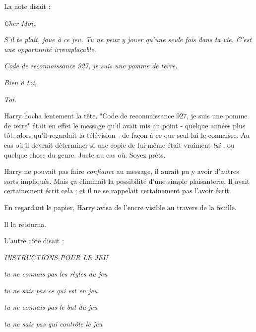 La note disait :

\emph{Cher Moi,} 

\emph{S'il te plaît, joue à ce jeu. Tu ne peux y jouer qu'une seule fois dans ta vie. C'est une opportunité irremplaçable.} 

\emph{Code de reconnaissance 927, je suis une pomme de terre.} 

\emph{Bien à toi,} 

\emph{Toi.} 

Harry hocha lentement la tête. "Code de reconnaissance 927, je suis une pomme de terre" était en effet le message qu'il avait mis au point - quelque années plus tôt, alors qu'il regardait la télévision - de façon à ce que seul lui le connaisse. Au cas où il devrait déterminer si une copie de lui-même était vraiment \emph{lui} , ou quelque chose du genre. Juste au cas où. Soyez prêts.

Harry ne pouvait pas faire \emph{confiance}  au message, il aurait pu y avoir d'autres sorts impliqués. Mais ça éliminait la possibilité d'une simple plaisanterie. Il avait certainement écrit cela ; et il ne se rappelait certainement pas l'avoir écrit.

En regardant le papier, Harry avisa de l'encre visible au travers de la feuille.

Il la retourna.

L'autre côté disait :


\begin{center}\emph{INSTRUCTIONS POUR LE JEU} \end{center}



\begin{center}\emph{tu ne connais pas les règles du jeu} \end{center}



\begin{center}\emph{tu ne sais pas ce qui est en jeu} \end{center}



\begin{center}\emph{tu ne connais pas le but du jeu} \end{center}



\begin{center}\emph{tu ne sais pas qui contrôle le jeu} \end{center}




